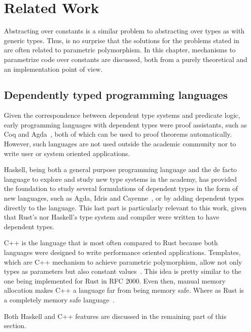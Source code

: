 \newcommand{\pdtn}[1] { \langle \text{#1} \rangle }

\chapter{Related Work}

\label{chap:related_work}

Abstracting over constants is a similar problem to abstracting over types as
with generic types. Thus, is no surprise that the solutions for the problems
stated in  are often related to parametric
polymorphism. In this chapter, mechanisms to parametrize code over constants are
discussed, both from a purely theoretical and an implementation point of view.

\section{Dependently typed programming languages}

Given the correspondence between dependent type systems and predicate logic,
early programming languages with dependent types were proof assistants, such as
Coq and Agda~\cite{agda}, both of which can be used to proof theorems
automatically.  However, such languages are not used outside the academic
community nor to write user or system oriented applications.

Haskell, being both a general purpose programming language and the de facto
language to explore and study new type systems in the academy, has provided the
foundation to study several formulations of dependent types in the form of new
languages, such as Agda, Idris \cite{idris} and Cayenne~\cite{cayenne}, or by
adding dependent types directly to the language. This last part is particularly
relevant to this work, given that Rust's nor Haskell's type system and compiler
were written to have dependent types.

C++ is the language that is most often compared to Rust because both languages
were designed to write performance oriented applications. Templates, which are
C++ mechanism to achieve parametric polymorphism, allow not only types as
parameters but also constant values~\cite{templates}. This idea is pretty
similar to the one being implemented for Rust in RFC 2000. Even then, manual
memory allocation makes C++ a language far from being memory safe. Where as Rust
is a completely memory safe language~\cite{ralf}.    

Both Haskell and C++ features are discussed in the remaining part of this
section.

